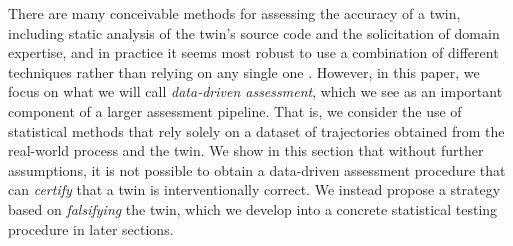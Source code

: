 There are many conceivable methods for assessing the accuracy of a twin, including static analysis of the twin's source code and the solicitation of domain expertise, and in practice it seems most robust to use a combination of different techniques rather than relying on any single one \citep{amse2018assessing,niederer2021scaling}.
However, in this paper, we focus on what we will call \emph{data-driven assessment}, which we see as an important component of a larger assessment pipeline. %
That is, we consider the use of statistical methods that rely solely on a dataset of trajectories obtained from the real-world process and the twin.
% 
We show in this section that without further assumptions, it is not possible to obtain a data-driven assessment procedure that can \emph{certify} that a twin is interventionally correct.
We instead propose a strategy based on \emph{falsifying} the twin, which we develop into a concrete statistical testing procedure in later sections.



